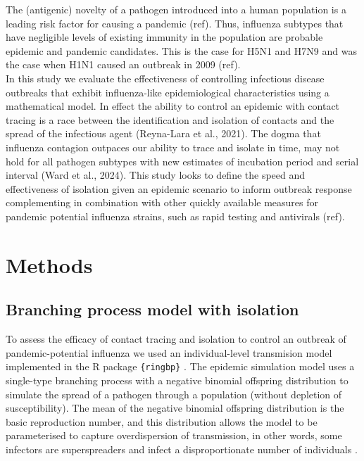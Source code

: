 \documentclass{article}
\begin{document}
The (antigenic) novelty of a pathogen introduced into a human population is a leading risk factor for causing a pandemic (ref). Thus, influenza subtypes that have negligible levels of existing immunity in the population are probable epidemic and pandemic candidates. This is the case for H5N1 and H7N9 \citep{tannerPandemicPotentialAvian2015} and was the case when H1N1 caused an outbreak in 2009 (ref). \\

In this study we evaluate the effectiveness of controlling infectious disease outbreaks that exhibit influenza-like epidemiological characteristics using a mathematical model. In effect the ability to control an epidemic with contact tracing is a race between the identification and isolation of contacts and the spread of the infectious agent (Reyna-Lara et al., 2021). The dogma that influenza contagion outpaces our ability to trace and isolate in time, may not hold for all pathogen subtypes with new estimates of incubation period and serial interval (Ward et al., 2024). This study looks to define the speed and effectiveness of isolation given an epidemic scenario to inform outbreak response complementing in combination with other quickly available measures for pandemic potential influenza strains, such as rapid testing and antivirals (ref).

\section*{Methods}

\subsection*{Branching process model with isolation}

To assess the efficacy of contact tracing and isolation to control an outbreak of pandemic-potential influenza we used an individual-level transmision model implemented in the R package \texttt{\{ringbp\}} \citep{hellewellRingbpSimulateEvaluate2025}. The epidemic simulation model uses a single-type branching process with a negative binomial offspring distribution to simulate the spread of a pathogen through a population (without depletion of susceptibility). The mean of the negative binomial offspring distribution is the basic reproduction number, and this distribution allows the model to be parameterised to capture overdispersion of transmission, in other words, some infectors are superspreaders and infect a disproportionate number of individuals \citep{lloyd-smithSuperspreadingEffectIndividual2005, kucharskiEarlyDynamicsTransmission2020}. \\
\end{document}
